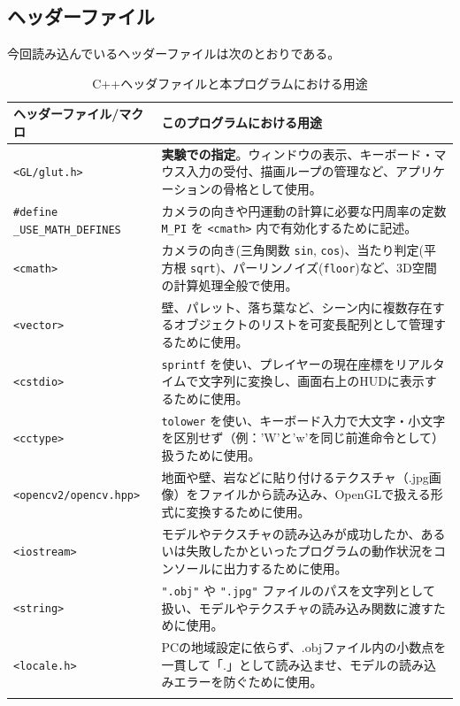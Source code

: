 \documentclass[uplatex,dvipdfmx,a4paper]{jsarticle}
\begin{document}
\subsection{ヘッダーファイル}
今回読み込んでいるヘッダーファイルは次のとおりである。
\begin{table}[H]
    \centering
    \caption{C++ヘッダファイルと本プログラムにおける用途}
    \label{tab:cpp_headers_intent}
    \begin{tabular}{lp{10cm}}
    \toprule
    \textbf{ヘッダーファイル/マクロ} & \textbf{このプログラムにおける用途} \\
    \midrule
    \texttt{<GL/glut.h>} & \textbf{実験での指定}。ウィンドウの表示、キーボード・マウス入力の受付、描画ループの管理など、アプリケーションの骨格として使用。 \\ \addlinespace
    \texttt{\#define \_USE\_MATH\_DEFINES} & カメラの向きや円運動の計算に必要な円周率の定数 \texttt{M\_PI} を \texttt{<cmath>} 内で有効化するために記述。 \\ \addlinespace
    \texttt{<cmath>} & カメラの向き(三角関数 \texttt{sin}, \texttt{cos})、当たり判定(平方根 \texttt{sqrt})、パーリンノイズ(\texttt{floor})など、3D空間の計算処理全般で使用。 \\ \addlinespace
    \texttt{<vector>} & 壁、パレット、落ち葉など、シーン内に複数存在するオブジェクトのリストを可変長配列として管理するために使用。 \\ \addlinespace
    \texttt{<cstdio>} & \texttt{sprintf} を使い、プレイヤーの現在座標をリアルタイムで文字列に変換し、画面右上のHUDに表示するために使用。 \\ \addlinespace
    \texttt{<cctype>} & \texttt{tolower} を使い、キーボード入力で大文字・小文字を区別せず（例：'W'と'w'を同じ前進命令として）扱うために使用。 \\ \addlinespace
    \texttt{<opencv2/opencv.hpp>} & 地面や壁、岩などに貼り付けるテクスチャ（.jpg画像）をファイルから読み込み、OpenGLで扱える形式に変換するために使用。 \\ \addlinespace
    \texttt{<iostream>} & モデルやテクスチャの読み込みが成功したか、あるいは失敗したかといったプログラムの動作状況をコンソールに出力するために使用。 \\ \addlinespace
    \texttt{<string>} & \texttt{".obj"} や \texttt{".jpg"} ファイルのパスを文字列として扱い、モデルやテクスチャの読み込み関数に渡すために使用。 \\ \addlinespace
    \texttt{<locale.h>} & PCの地域設定に依らず、.objファイル内の小数点を一貫して「.」として読み込ませ、モデルの読み込みエラーを防ぐために使用。 \\ \addlinespace

\end{tabular}
\end{table}
\end{document}
